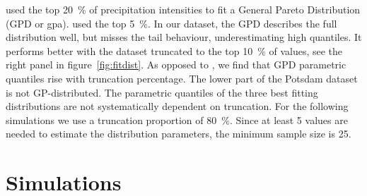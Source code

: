 \documentclass[a4paper]{article}
\begin{document}
\begin{multicols}{2}
\citet{berg_seasonal_2009} used the top 20~\% of precipitation intensities to fit a General Pareto Distribution (GPD or gpa).
\citet{lenderink_increase_2008} used the top 5~\%.
In our dataset, the GPD describes the full distribution well, but misses the tail behaviour, underestimating high quantiles.
It performs better with the dataset truncated to the top 10~\% of values, see the right panel in figure~\ref{fig:fitdist}.
As opposed to \citet{haerter_heavy_2010}, we find that GPD parametric quantiles rise with truncation percentage. 
The lower part of the Potsdam dataset is not GP-distributed.
The parametric quantiles of the three best fitting distributions are not systematically dependent on truncation.
For the following simulations we use a truncation proportion of 80~\%.
Since at least 5 values are needed to estimate the distribution parameters, the minimum sample size is 25.


\end{multicols}


\pagebreak

\section{Simulations} %
\end{document}
